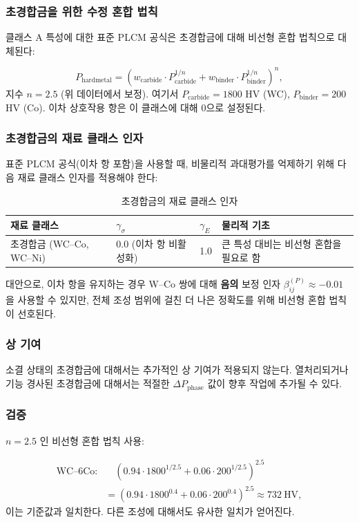 \documentclass[12pt,a4paper]{article}
\begin{document}
	\subsubsection{초경합금을 위한 수정 혼합 법칙}
	클래스 A 특성에 대한 표준 PLCM 공식은 초경합금에 대해 비선형 혼합 법칙으로 대체된다:
	
	\[
	P_{\text{hardmetal}} = \left( w_{\text{carbide}} \cdot P_{\text{carbide}}^{1/n} + w_{\text{binder}} \cdot P_{\text{binder}}^{1/n} \right)^{n},
	\]
	지수 $n = 2.5$ (위 데이터에서 보정). 여기서 $P_{\text{carbide}} = 1800$ HV (WC), $P_{\text{binder}} = 200$ HV (Co). 이차 상호작용 항은 이 클래스에 대해 0으로 설정된다.
	
	\subsubsection{초경합금의 재료 클래스 인자}
	표준 PLCM 공식(이차 항 포함)을 사용할 때, 비물리적 과대평가를 억제하기 위해 다음 재료 클래스 인자를 적용해야 한다:
	
	\begin{longtable}{p{3.5cm} p{2.5cm} p{2.5cm} p{5cm}}
		\caption{초경합금의 재료 클래스 인자}\\
		\toprule
		\textbf{재료 클래스} & $\gamma_{\sigma}$ & $\gamma_{E}$ & \textbf{물리적 기초} \\
		\midrule
		초경합금 (WC–Co, WC–Ni) & 0.0 (이차 항 비활성화) & 1.0 & 큰 특성 대비는 비선형 혼합을 필요로 함 \\
		\bottomrule
	\end{longtable}
	
	대안으로, 이차 항을 유지하는 경우 W–Co 쌍에 대해 \textbf{음의} 보정 인자 $\beta_{ij}^{(P)} \approx -0.01$ 을 사용할 수 있지만, 전체 조성 범위에 걸친 더 나은 정확도를 위해 비선형 혼합 법칙이 선호된다.
	
	\subsubsection{상 기여}
	소결 상태의 초경합금에 대해서는 추가적인 상 기여가 적용되지 않는다. 열처리되거나 기능 경사된 초경합금에 대해서는 적절한 $\Delta P_{\text{phase}}$ 값이 향후 작업에 추가될 수 있다.
	
	\subsubsection{검증}
	$n=2.5$ 인 비선형 혼합 법칙 사용:
	
	\[
	\begin{aligned}
		\text{WC–6Co:}&\quad (0.94\cdot1800^{1/2.5} + 0.06\cdot200^{1/2.5})^{2.5} \\
		&= (0.94\cdot1800^{0.4} + 0.06\cdot200^{0.4})^{2.5} \approx 732\ \text{HV},
	\end{aligned}
	\]
	이는 기준값과 일치한다. 다른 조성에 대해서도 유사한 일치가 얻어진다.
	
\end{document}
